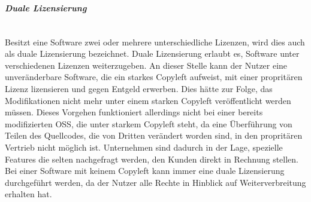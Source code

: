 \subparagraph{Duale Lizensierung} $~$

Besitzt eine Software zwei oder mehrere unterschiedliche Lizenzen, wird dies auch als duale Lizensierung bezeichnet. Duale Lizensierung erlaubt es, Software unter verschiedenen Lizenzen weiterzugeben. \cite{gerlach_praxisprobleme_2006} An dieser Stelle kann der Nutzer eine unveränderbare Software, die ein starkes Copyleft aufweist, mit einer propritären Lizenz lizensieren und gegen Entgeld erwerben. \cite[S. 29]{bitkom_open_2016} Dies hätte zur Folge, das Modifikationen nicht mehr unter einem starken Copyleft veröffentlicht werden müssen. Dieses Vorgehen funktioniert allerdings nicht bei einer bereits modifizierten OSS, die unter starkem Copyleft steht, da eine Überführung von Teilen des Quellcodes, die von Dritten verändert worden sind, in den propritären Vertrieb nicht möglich ist. \cite[S. 31]{schaaf_open-source-lizenzen_2013} Unternehmen sind dadurch in der Lage, spezielle Features die selten nachgefragt werden, den Kunden direkt in Rechnung stellen. \cite[S. 29]{bitkom_open_2016} Bei einer Software mit keinem Copyleft kann immer eine duale Lizensierung durchgeführt werden, da der Nutzer alle Rechte in Hinblick auf Weiterverbreitung erhalten hat. 






